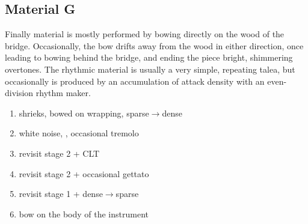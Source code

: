 \subsection{Material G}

Finally material  is mostly performed by bowing directly on the wood of the bridge. Occasionally, the bow drifts away from the wood in either direction, once leading to bowing behind the bridge, and ending the piece bright, shimmering overtones. The rhythmic material is usually a very simple, repeating talea, but occasionally is produced by an accumulation of attack density with an even-division rhythm maker.

\begin{enumerate}
\item shrieks, bowed on wrapping, sparse$\rightarrow$dense
\item white noise, , occasional tremolo
\item revisit stage 2 + \ac{CLT}
\item revisit stage 2 + occasional gettato
\item revisit stage 1 + dense$\rightarrow$sparse
\item bow on the body of the instrument
\end{enumerate}

